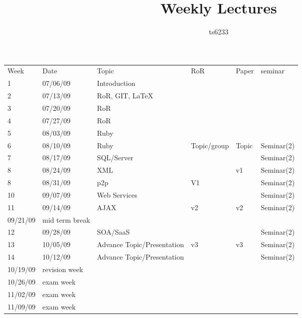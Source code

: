 \documentclass[12pt]{article}
\title{Weekly Lectures}
\author{ts6233}
\date{}
\begin{document}
\nocite{*}

\maketitle

\begin{tabular}{@{}llllll@{}} \toprule			
Week &	Date & 	Topic & 	RoR & 	Paper & 	seminar \\ \cmidrule{1-6}	
1 &	07/06/09	& Introduction &	&	&	\\
2 &	07/13/09	& RoR, GIT, LaTeX &	&	&	\\
3 &	07/20/09	& RoR &	&	&	\\
4 &	07/27/09	& RoR &	&	&	\\ \cmidrule{1-6}
5 &	08/03/09	& Ruby &	&	&	\\
6 &	08/10/09	& Ruby &	Topic/group  &	Topic &	Seminar(2) \\
7 &	08/17/09	& SQL/Server &	&	&	Seminar(2)\\
8 &	08/24/09	& XML &	&	v1&	Seminar(2)\\
8 &	08/31/09	& p2p &	V1 &	&	Seminar(2)\\ \cmidrule{1-6}
10 &	09/07/09	& Web Services &	&	&	Seminar(2) \\
11 &	09/14/09	& AJAX &	v2&	v2&	Seminar(2)\\
	09/21/09	& mid term break	&	&	\\
12 &	09/28/09	& SOA/SaaS &	&	&	Seminar(2)\\ \cmidrule{1-6}
13 &	10/05/09	& Advance Topic/Presentation &	v3&	v3&	Seminar(2)\\
14 &	10/12/09	& Advance Topic/Presentation &	&	&	Seminar(2)\\
	10/19/09	& revision week	&	&	\\
	10/26/09	& exam week	&	&	\\
	11/02/09	& exam week	&	&	\\
	11/09/09	& exam week	&	&	\\ \bottomrule
\end{tabular}
\end{document}
